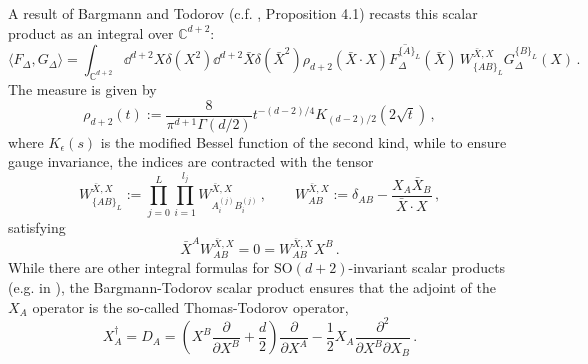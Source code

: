 \documentclass{article}
\def \Dg {\Delta}
\def \dg {\delta}
\def \ds {\partial}
\def \Cs {\mathbb{C}}
\begin{document}
A result of Bargmann and Todorov (c.f. \cite{Bargmann_1977}, Proposition 4.1) recasts this scalar product as an integral over $\Cs^{d+2}$:
\begin{equation}
      \langle F_{\Dg}, G_{\Dg} \rangle = \int_{\Cs^{d+2}} \dd^{d+2} X \dg(X^2)   \dd^{d+2} \bar{X} \dg(\bar{X}^2)  \rho_{d+2}(\bar{X}\cdot X) \overline{F_{\Dg}^{\{A\}_L}}(\bar{X}) \, W_{\{AB\}_L}^{\bar{X},X} G_{\Dg}^{\{B\}_L}(X)\,. 
      \label{BT_integral}
\end{equation}
The measure is given by 
\begin{equation}
\rho_{d+2}(t):= \frac{8}{\pi^{d+1}\Gamma(d/2)} t^{-(d-2)/4} K_{(d-2)/2}(2\sqrt{t})\,,
\end{equation}
where $K_{\epsilon}(s)$ is the modified Bessel function of the second kind, while to ensure gauge invariance, the indices are contracted with the tensor
\begin{equation}
    W_{\{AB\}_L}^{\bar{X},X} := \prod_{j=0}^L \prod_{i=1}^{l_j} W_{A_i^{(j)} B_i^{(j)}}^{\bar{X},X}\,, \qquad W_{AB}^{\bar{X},X} := \dg_{AB}-\frac{X_A \bar{X}_B}{\bar{X}\cdot X}\,, 
\end{equation}
satisfying
\begin{equation}
    \bar{X}^A W_{AB}^{\bar{X},X} = 0 = W_{AB}^{\bar{X},X} X^B\,. 
\end{equation}
While there are other integral formulas for $\mathrm{SO}(d+2)$-invariant scalar products (e.g. in \cite{SimmonsDuffin:2012uy}), the Bargmann-Todorov scalar product ensures that the adjoint of the $X_A$ operator is the so-called Thomas-Todorov operator,
\begin{equation}
X_A^{\dagger} = D_A = \left(X^B \frac{\ds}{\ds X^B} + \frac{d}{2}\right) \frac{\ds}{\ds X^A} - \frac{1}{2} X_A \frac{\ds^2}{\ds X^B \ds X_B}\,.   
\end{equation}
\end{document}
